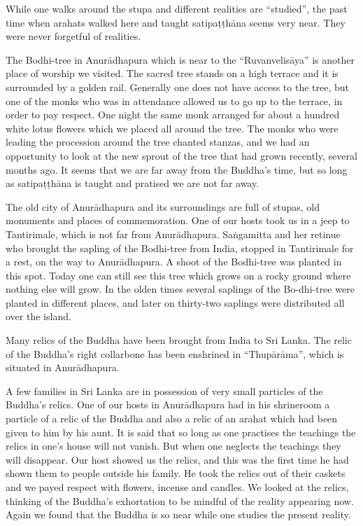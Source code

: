 While one walks around the stupa and different realities are
``studied'', the past time when arahats walked here and taught
satipaṭṭhāna seems very near. They were never forgetful of realities.

The Bodhi-tree in Anurādhapura which is near to the ``Ruvanvelisāya'' is
another place of worship we visited. The sacred tree stands on a high
terrace and it is surrounded by a golden rail. Generally one does not
have access to the tree, but one of the monks who was in attendance
allowed us to go up to the terrace, in order to pay respect. One night
the same monk arranged for about a hundred white lotus flowers which we
placed all around the tree. The monks who were leading the procession
around the tree chanted stanzas, and we had an opportunity to look at
the new sprout of the tree that had grown recently, several months ago.
It seems that we are far away from the Buddha's time, but so long as
satipaṭṭhāna is taught and pratised we are not far away.

The old city of Anurādhapura and its surroundings are full of stupas,
old monuments and places of commemoration. One of our hosts took us in a
jeep to Tantirimale, which is not far from Anurādhapura. Saṅgamitta and
her retinue who brought the sapling of the Bodhi-tree from India,
stopped in Tantirimale for a rest, on the way to Anurādhapura. A shoot
of the Bodhi-tree was planted in this spot. Today one can still see this
tree which grows on a rocky ground where nothing else will grow. In the
olden times several saplings of the Bo-dhi-tree were planted in
different places, and later on thirty-two saplings were distributed all
over the island.

Many relics of the Buddha have been brought from India to Sri Lanka. The
relic of the Buddha's right collarbone has been enshrined in
``Thupārāma'', which is situated in Anurādhapura.

A few families in Sri Lanka are in possession of very small particles of
the Buddha's relics. One of our hosts in Anurādhapura had in his
shrineroom a particle of a relic of the Buddha and also a relic of an
arahat which had been given to him by his aunt. It is said that so long
as one practises the teachings the relics in one's house will not
vanish. But when one neglects the teachings they will disappear. Our
host showed us the relics, and this was the first time he had shown them
to people outside his family. He took the relics out of their caskets
and we payed respect with flowers, incense and candles. We looked at the
relics, thinking of the Buddha's exhortation to be mindful of the
reality appearing now. Again we found that the Buddha is so near while
one studies the present reality.

